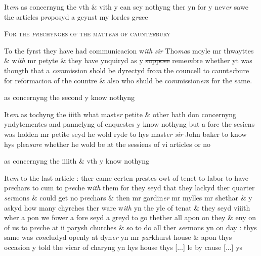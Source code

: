 \documentclass[12pt, a4paper]{book}
\begin{document}
            		
		\ifthenelse{\isodd{\thepage}}
		{\reversemarginpar}
		{\normalmarginpar}
		It\textit{em} as concernyng the vth \& vith y can sey nothyng ther yn for y nev\textit{er} sawe the articles p\textit{ro}posyd a geynst my lordes g\textit{ra}ce
            		
            		
				\begin{center} \begin{large} {\scshape For the \textit{pre}chynges of the matt\textit{er}s of caunt\textit{er}bury} \end{large} \end{center}
			
            		
            		
		\ifthenelse{\isodd{\thepage}}
		{\reversemarginpar}
		{\normalmarginpar}
		To the fyrst they have had communicacion w\textit{ith} \textit{sir} Tho\textit{ma}s moyle mr thwayttes \& w\textit{ith} mr petyte \& they have ynquiryd as y \sout{suppose }reme\textit{m}bre whether yt was thougth that a \textit{com}mission shold be dyrectyd fro\textit{m} the councell to caunt\textit{er}bure for reformacio\textit{n} of the countre \& also who shuld be co\textit{m}mission\textit{er}s for the same. 
            	
            		
		\ifthenelse{\isodd{\thepage}}
		{\reversemarginpar}
		{\normalmarginpar}
		as concernyng the second y know nothyng
            		
            		
		\ifthenelse{\isodd{\thepage}}
		{\reversemarginpar}
		{\normalmarginpar}
		It\textit{em} as tochyng the iiith what mast\textit{er} petite \& other
			 hath don concernyng yndytementes and pannelyng of enquestes y know nothyng but a fore the sesiens was holden mr petite seyd he wold ryde to hys mast\textit{er}
            			\textit{sir} John baker to know hys plea\textit{sure} whether he wold be at the sessiens of vi articles or no
            		
		\ifthenelse{\isodd{\thepage}}
		{\reversemarginpar}
		{\normalmarginpar}
		 as concernyng the iiiith \& vth y know nothyng
            		
		\ifthenelse{\isodd{\thepage}}
		{\reversemarginpar}
		{\normalmarginpar}
		It\textit{em} to the last article 
			: ther came certen prestes owt of tenet to labor to have p\textit{re}chars to cum to p\textit{re}che w\textit{ith} them for they seyd that they lackyd ther quarter \textit{ser}mons \& could get no p\textit{re}chars \& then mr gardin\textit{er} mr mylles mr shethar \& y askyd how many chyrches ther ware w\textit{ith} yn the yle of tenat \& they seyd viiith wher a pon we fower a fore seyd a greyd to go thether all apon on they \& eny on of us to p\textit{re}che at ii parysh churches \& so to do all ther \textit{ser}mons yn on day : thys same was \textit{con}cludyd openly at dyn\textit{er} yn mr \textit{par}khurst house \& apon thys occasion y told the vicar of charyng yn hys house
			 thys 
				[...]
			le by cause 
				[...]
			ys
\end{document}
